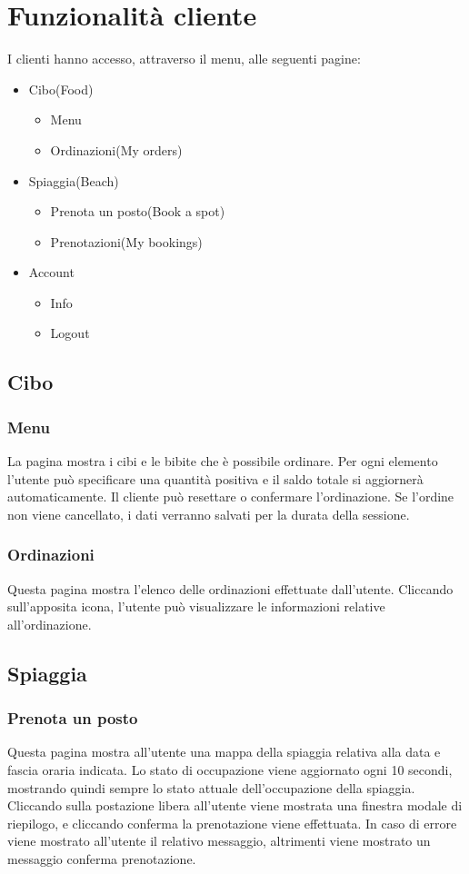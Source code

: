 \documentclass{article}
\begin{document}
\section{Funzionalità cliente}
I clienti hanno accesso, attraverso il menu, alle seguenti pagine:
\begin{itemize}
	\item Cibo(Food)
	\begin{itemize}
		\item Menu
		\item Ordinazioni(My orders)
	\end{itemize}
	\item Spiaggia(Beach)
	\begin{itemize}
		\item Prenota un posto(Book a spot)
		\item Prenotazioni(My bookings)
	\end{itemize}
	\item Account
	\begin{itemize}
		\item Info
		\item Logout
	\end{itemize}
\end{itemize}
\subsection{Cibo}
\subsubsection{Menu}
La pagina mostra i cibi e le bibite che è possibile ordinare. Per ogni elemento l'utente può specificare una quantità positiva e il saldo totale si aggiornerà automaticamente. Il cliente può resettare o confermare l'ordinazione. Se l'ordine non viene cancellato, i dati verranno salvati per la durata della sessione.
\subsubsection{Ordinazioni}
Questa pagina mostra l'elenco delle ordinazioni effettuate dall'utente. Cliccando sull'apposita icona, l'utente può visualizzare le informazioni relative all'ordinazione.
\subsection{Spiaggia}
\subsubsection{Prenota un posto}
Questa pagina mostra all'utente una mappa della spiaggia relativa alla data e fascia oraria indicata. Lo stato di occupazione viene aggiornato ogni 10 secondi, mostrando quindi sempre lo stato attuale dell'occupazione della spiaggia. Cliccando sulla postazione libera all'utente viene mostrata una finestra modale di riepilogo, e cliccando conferma la prenotazione viene effettuata. In caso di errore viene mostrato all'utente il relativo messaggio, altrimenti viene mostrato un messaggio conferma prenotazione.
\end{document}
